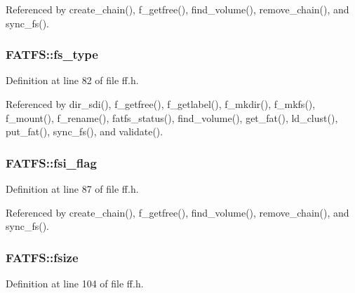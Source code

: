 Referenced by create\+\_\+chain(), f\+\_\+getfree(), find\+\_\+volume(), remove\+\_\+chain(), and sync\+\_\+fs().

\subsubsection[{\texorpdfstring{fs\+\_\+type}{fs_type}}]{ F\+A\+T\+F\+S\+::fs\+\_\+type}\hypertarget{structFATFS_add27d97babe807b573eac98a71dc4ae5}{}\label{structFATFS_add27d97babe807b573eac98a71dc4ae5}


Definition at line 82 of file ff.\+h.



Referenced by dir\+\_\+sdi(), f\+\_\+getfree(), f\+\_\+getlabel(), f\+\_\+mkdir(), f\+\_\+mkfs(), f\+\_\+mount(), f\+\_\+rename(), fatfs\+\_\+status(), find\+\_\+volume(), get\+\_\+fat(), ld\+\_\+clust(), put\+\_\+fat(), sync\+\_\+fs(), and validate().

\subsubsection[{\texorpdfstring{fsi\+\_\+flag}{fsi_flag}}]{ F\+A\+T\+F\+S\+::fsi\+\_\+flag}\hypertarget{structFATFS_a84e9cdc5a6a8e33ea7ec192058abf161}{}\label{structFATFS_a84e9cdc5a6a8e33ea7ec192058abf161}


Definition at line 87 of file ff.\+h.



Referenced by create\+\_\+chain(), f\+\_\+getfree(), find\+\_\+volume(), remove\+\_\+chain(), and sync\+\_\+fs().

\subsubsection[{\texorpdfstring{fsize}{fsize}}]{ F\+A\+T\+F\+S\+::fsize}\hypertarget{structFATFS_a53e9560659f14e66f306c2c444198bf3}{}\label{structFATFS_a53e9560659f14e66f306c2c444198bf3}


Definition at line 104 of file ff.\+h.



